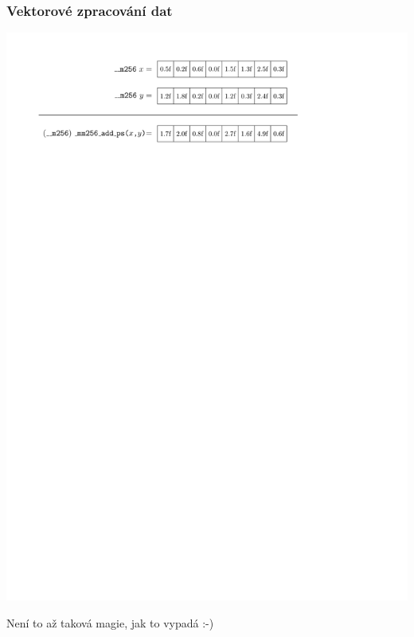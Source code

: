 \documentclass[usenames,dvipsnames,9pt]{beamer}
\begin{document}
\begin{frame}
  \frametitle{Vektorové zpracování dat}
  \begin{center}
    \includegraphics[width=0.95\linewidth]{figs/vectorized.pdf}
  \end{center}
  \pause
  \vspace{1.5em}
  \begin{center}
    \LARGE Není to až taková magie, jak to vypadá :-)
  \end{center}
\end{frame}
\end{document}
